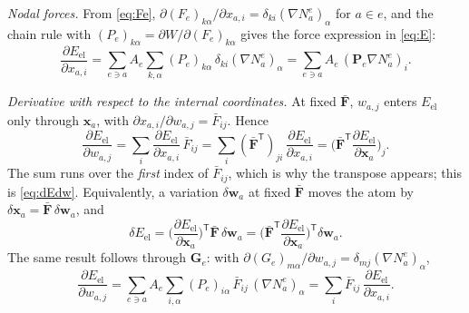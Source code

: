 \documentclass[11pt,a4paper]{article}
\newcommand{\Fb}{\bar{\mathbf F}}
\newcommand{\Pk}{\mathbf P}
\newcommand{\x}{\mathbf x}
\newcommand{\w}{\mathbf w}
\newcommand{\G}{\mathbf G}
\begin{document}
\emph{Nodal forces.} From \eqref{eq:Fe}, \(\partial(F_e)_{k\alpha}/\partial x_{a,i}=\delta_{ki}(\nabla N^e_a)_\alpha\)
for \(a\in e\), and the chain rule with \((P_e)_{k\alpha}=\partial W/\partial(F_e)_{k\alpha}\) gives the
force expression in \eqref{eq:E}:
\begin{equation}
  \frac{\partial E_{\mathrm{el}}}{\partial x_{a,i}}
  =\sum_{e\ni a}A_e\sum_{k,\alpha}(P_e)_{k\alpha}\,\delta_{ki}(\nabla N^e_a)_\alpha
  =\sum_{e\ni a}A_e\,(\Pk_e\nabla N^e_a)_i .
\end{equation}

\emph{Derivative with respect to the internal coordinates.} At fixed \(\Fb\), \(w_{a,j}\) enters
\(E_{\mathrm{el}}\) only through \(\x_a\), with \(\partial x_{a,i}/\partial w_{a,j}=\bar F_{ij}\). Hence
\begin{equation}
  \frac{\partial E_{\mathrm{el}}}{\partial w_{a,j}}
  =\sum_i\frac{\partial E_{\mathrm{el}}}{\partial x_{a,i}}\,\bar F_{ij}
  =\sum_i(\Fb^{\mathsf T})_{ji}\,\frac{\partial E_{\mathrm{el}}}{\partial x_{a,i}}
  =\Big(\Fb^{\mathsf T}\frac{\partial E_{\mathrm{el}}}{\partial\x_a}\Big)_j .
\end{equation}
The sum runs over the \emph{first} index of \(\bar F_{ij}\), which is why the transpose appears; this
is \eqref{eq:dEdw}. Equivalently, a variation \(\delta\w_a\) at fixed \(\Fb\) moves the atom by
\(\delta\x_a=\Fb\,\delta\w_a\), and
\[
  \delta E_{\mathrm{el}}=\Big(\frac{\partial E_{\mathrm{el}}}{\partial\x_a}\Big)^{\mathsf T}\Fb\,\delta\w_a
  =\Big(\Fb^{\mathsf T}\frac{\partial E_{\mathrm{el}}}{\partial\x_a}\Big)^{\mathsf T}\delta\w_a .
\]
The same result
follows through \(\G_e\): with \(\partial(G_e)_{m\alpha}/\partial w_{a,j}=\delta_{mj}(\nabla N^e_a)_\alpha\),
\[
  \frac{\partial E_{\mathrm{el}}}{\partial w_{a,j}}
  =\sum_{e\ni a}A_e\sum_{i,\alpha}(P_e)_{i\alpha}\,\bar F_{ij}\,(\nabla N^e_a)_\alpha
  =\sum_i\bar F_{ij}\,\frac{\partial E_{\mathrm{el}}}{\partial x_{a,i}} .
\]
\end{document}
